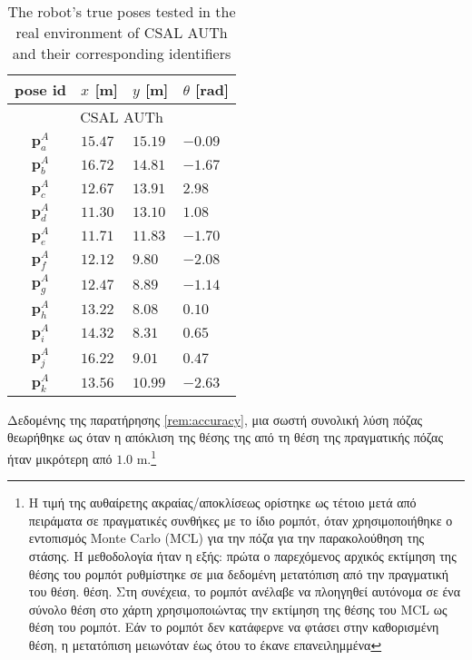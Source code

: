 \begin{table}\centering
  \begin{tabular} {c|lll} \midrule
    pose id & $x$ [m]   & $y$  [m]  & $\theta$ [rad]         \\ \midrule
    \multicolumn{4}{c}{CSAL AUTh}                            \\ \midrule
    $\bm{p}_a^A$   & $15.47$   & $15.19$   & $-0.09$         \\
    $\bm{p}_b^A$   & $16.72$   & $14.81$   & $-1.67$         \\
    $\bm{p}_c^A$   & $12.67$   & $13.91$   & $2.98$          \\
    $\bm{p}_d^A$   & $11.30$   & $13.10$   & $1.08$          \\
    $\bm{p}_e^A$   & $11.71$   & $11.83$   & $-1.70$         \\
    $\bm{p}_f^A$   & $12.12$   & $9.80$    & $-2.08$         \\
    $\bm{p}_g^A$   & $12.47$   & $8.89$    & $-1.14$         \\
    $\bm{p}_h^A$   & $13.22$   & $8.08$    & $0.10$          \\
    $\bm{p}_i^A$   & $14.32$   & $8.31$    & $0.65$          \\
    $\bm{p}_j^A$   & $16.22$   & $9.01$    & $0.47$          \\
    $\bm{p}_k^A$   & $13.56$   & $10.99$   & $-2.63$         \\ \midrule
  \end{tabular}
  \caption{\small The robot's true poses tested in the real environment of CSAL
           AUTh and their corresponding identifiers}
  \label{tbl:true_poses_experiment}
\end{table}


Δεδομένης της παρατήρησης \ref{rem:accuracy}, μια σωστή συνολική λύση πόζας θεωρήθηκε ως
όταν η απόκλιση της θέσης της από τη θέση της πραγματικής πόζας ήταν
μικρότερη από $1.0$ m.\footnote{Η τιμή της αυθαίρετης ακραίας/αποκλίσεως
ορίστηκε ως τέτοιο μετά από πειράματα σε πραγματικές συνθήκες
με το ίδιο ρομπότ, όταν χρησιμοποιήθηκε ο εντοπισμός Monte Carlo (MCL) για την πόζα
για την παρακολούθηση της στάσης. Η μεθοδολογία ήταν η εξής: πρώτα ο παρεχόμενος αρχικός
εκτίμηση της θέσης του ρομπότ ρυθμίστηκε σε μια δεδομένη μετατόπιση από την πραγματική του θέση.
θέση. Στη συνέχεια, το ρομπότ ανέλαβε να πλοηγηθεί αυτόνομα σε ένα σύνολο
θέση στο χάρτη χρησιμοποιώντας την εκτίμηση της θέσης του MCL ως θέση του ρομπότ. Εάν το ρομπότ
δεν κατάφερνε να φτάσει στην καθορισμένη θέση, η μετατόπιση μειωνόταν έως ότου
το έκανε επανειλημμένα}

